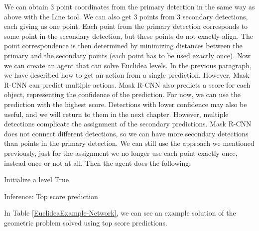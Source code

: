 We can obtain 3 point coordinates from the primary detection in the same way as above with the Line tool. We can also get 3 points from 3 secondary detections, each giving us one point. Each point from the primary detection corresponds to some point in the secondary detection, but these points do not exactly align. The point correspondence is then determined by minimizing distances between the primary and the secondary points (each point has to be used exactly once).
\newline \newline
\label{inferene_highest_score}
Now we can create an agent that can solve Euclidea levels. In the previous paragraph, we have described how to get an action from a single prediction.  However, Mask {R-CNN} can predict multiple actions. Mask {R-CNN} also predicts a score for each object, representing the confidence of the prediction.  For now, we can use the prediction with the highest score.  Detections with lower confidence may also be useful, and we will return to them in the next chapter.  However, multiple detections complicate the assignment of the secondary predictions. Mask {R-CNN} does not connect different detections, so we can have more secondary detections than points in the primary detection. We can still use the approach we mentioned previously, just for the assignment we no longer use each point exactly once, instead once or not at all. 
Then the agent does the following:
\label{top_score_inference}
\begin{algorithm}[h!]
\SetAlgoLined
 Initialize a level\;
 \Return True\;
 
\caption{Inference: Top score prediction}
\end{algorithm}

In Table \ref{EuclideaExample-Network}, we can see an example solution of the geometric problem solved using top score predictions.

